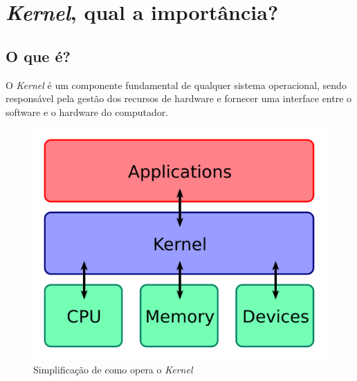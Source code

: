 \section{\textit{Kernel}, qual a importância?} \label{section: kernel}
\subsection{O que é?}
O \textit{Kernel} é um componente fundamental de qualquer sistema operacional, sendo responsável pela gestão dos recursos de hardware e fornecer uma interface entre o software e o hardware do computador. \cite{kernel}

\begin{figure}[H]
  \centering
  \includegraphics[scale=0.2]{Figures/0. General/kernel.png}
  \caption{Simplificação de como opera o \textit{Kernel}}
  \label{Simplificação da operação do Kernel}
\end{figure}

